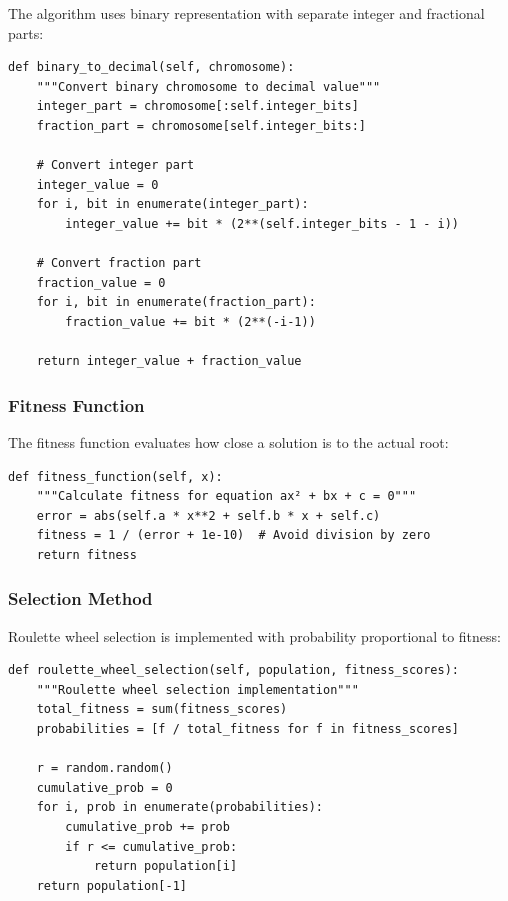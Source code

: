 \documentclass[11pt,a4paper]{article}
\begin{document}
The algorithm uses binary representation with separate integer and fractional parts:

\begin{verbatim}
def binary_to_decimal(self, chromosome):
    """Convert binary chromosome to decimal value"""
    integer_part = chromosome[:self.integer_bits]
    fraction_part = chromosome[self.integer_bits:]
    
    # Convert integer part
    integer_value = 0
    for i, bit in enumerate(integer_part):
        integer_value += bit * (2**(self.integer_bits - 1 - i))
    
    # Convert fraction part
    fraction_value = 0
    for i, bit in enumerate(fraction_part):
        fraction_value += bit * (2**(-i-1))
        
    return integer_value + fraction_value
\end{verbatim}

\subsubsection{Fitness Function}

The fitness function evaluates how close a solution is to the actual root:

\begin{verbatim}
def fitness_function(self, x):
    """Calculate fitness for equation ax² + bx + c = 0"""
    error = abs(self.a * x**2 + self.b * x + self.c)
    fitness = 1 / (error + 1e-10)  # Avoid division by zero
    return fitness
\end{verbatim}

\subsubsection{Selection Method}

Roulette wheel selection is implemented with probability proportional to fitness:

\begin{verbatim}
def roulette_wheel_selection(self, population, fitness_scores):
    """Roulette wheel selection implementation"""
    total_fitness = sum(fitness_scores)
    probabilities = [f / total_fitness for f in fitness_scores]
    
    r = random.random()
    cumulative_prob = 0
    for i, prob in enumerate(probabilities):
        cumulative_prob += prob
        if r <= cumulative_prob:
            return population[i]
    return population[-1]
\end{verbatim}
\end{document}
